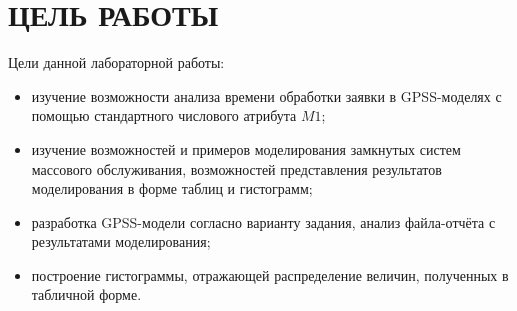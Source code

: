 \section{ЦЕЛЬ РАБОТЫ}

Цели данной лабораторной работы:

\begin{itemize}
\item
  изучение возможности анализа времени обработки заявки в GPSS-моделях с помощью
  стандартного числового атрибута $M1$;
\item
  изучение возможностей и примеров моделирования замкнутых систем
  массового обслуживания, возможностей представления результатов
  моделирования в форме таблиц и гистограмм;
\item
  разработка GPSS-модели согласно варианту задания,
  анализ файла-отчёта с результатами моделирования;
\item
  построение гистограммы, отражающей распределение величин, полученных
  в табличной форме.
\end{itemize}
